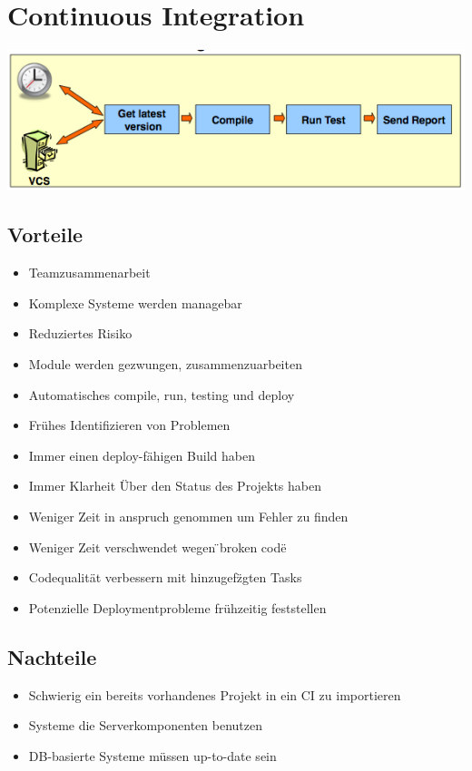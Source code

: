 \documentclass[a4paper,10pt]{article}
\begin{document}
\newpage
\section{Continuous Integration}
\includegraphics[scale=0.8]{continuous_integration.png}
\subsection{Vorteile}
\begin{itemize}
 \item Teamzusammenarbeit
 \item Komplexe Systeme werden managebar
 \item Reduziertes Risiko
 \item Module werden gezwungen, zusammenzuarbeiten
 \item Automatisches compile, run, testing und deploy
 \item Frühes Identifizieren von Problemen
 \item Immer einen deploy-f\"ahigen Build haben
 \item Immer Klarheit \"Uber den Status des Projekts haben
 \item Weniger Zeit in anspruch genommen um Fehler zu finden
 \item Weniger Zeit verschwendet wegen \"{ }broken code\"{ }
 \item Codequalit\"at verbessern mit hinzugef\"zgten Tasks
 \item Potenzielle Deploymentprobleme fr\"uhzeitig feststellen
\end{itemize}

\subsection{Nachteile}
\begin{itemize}
 \item Schwierig ein bereits vorhandenes Projekt in ein CI zu importieren
 \item Systeme die Serverkomponenten benutzen
 \item DB-basierte Systeme m\"ussen up-to-date sein
\end{itemize}
\end{document}
